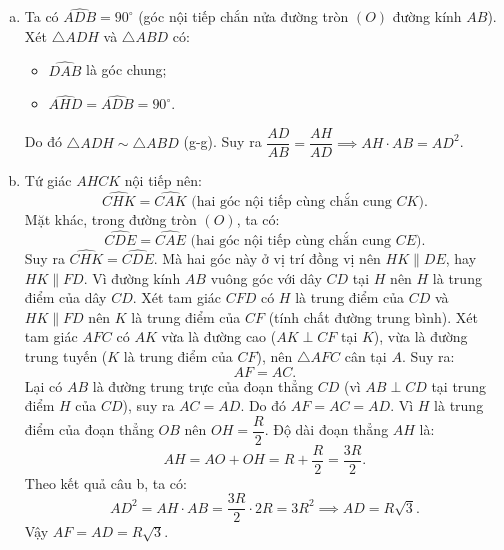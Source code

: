 \begin{bt}
{\begin{enumerate}[a)]
	Do đó tứ giác $AHCK$ nội tiếp đường tròn đường kính $AC$.
	\item Ta có $\widehat{ADB} = 90^\circ$ (góc nội tiếp chắn nửa đường tròn $(O)$ đường kính $AB$).
	Xét $\triangle ADH$ và $\triangle ABD$ có:
	\begin{itemize}
		\item $\widehat{DAB}$ là góc chung;
		\item $\widehat{AHD} = \widehat{ADB} = 90^\circ$.
	\end{itemize}
	Do đó $\triangle ADH \sim \triangle ABD$ (g-g).
	Suy ra $\dfrac{AD}{AB} = \dfrac{AH}{AD} \implies AH \cdot AB = AD^2$.
	\item Tứ giác $AHCK$ nội tiếp nên:
	$$\widehat{CHK} = \widehat{CAK} \text{ (hai góc nội tiếp cùng chắn cung } CK\text{)}.$$
	Mặt khác, trong đường tròn $(O)$, ta có:
	$$\widehat{CDE} = \widehat{CAE} \text{ (hai góc nội tiếp cùng chắn cung } CE\text{)}.$$
	Suy ra $\widehat{CHK} = \widehat{CDE}$.
	Mà hai góc này ở vị trí đồng vị nên $HK \parallel DE$, hay $HK \parallel FD$.
	Vì đường kính $AB$ vuông góc với dây $CD$ tại $H$ nên $H$ là trung điểm của dây $CD$.
	Xét tam giác $CFD$ có $H$ là trung điểm của $CD$ và $HK \parallel FD$ nên $K$ là trung điểm của $CF$ (tính chất đường trung bình).
	Xét tam giác $AFC$ có $AK$ vừa là đường cao ($AK \perp CF$ tại $K$), vừa là đường trung tuyến ($K$ là trung điểm của $CF$), nên $\triangle AFC$ cân tại $A$.
	Suy ra:
	$$AF = AC.$$
	Lại có $AB$ là đường trung trực của đoạn thẳng $CD$ (vì $AB \perp CD$ tại trung điểm $H$ của $CD$), suy ra $AC = AD$.
	Do đó $AF = AC = AD$.
	Vì $H$ là trung điểm của đoạn thẳng $OB$ nên $OH = \dfrac{R}{2}$.
	Độ dài đoạn thẳng $AH$ là:
	$$AH = AO + OH = R + \dfrac{R}{2} = \dfrac{3R}{2}.$$
	Theo kết quả câu b, ta có:
	$$AD^2 = AH \cdot AB = \dfrac{3R}{2} \cdot 2R = 3R^2 \implies AD = R\sqrt{3}.$$
	Vậy $AF = AD = R\sqrt{3}$.
\end{enumerate}
}
\end{bt}

